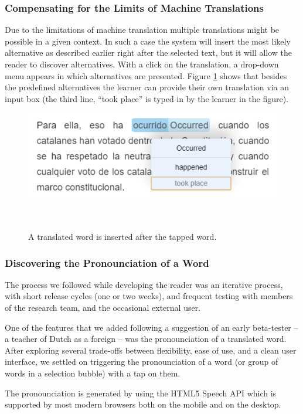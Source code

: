 \subsubsection{Compensating for the Limits of Machine Translations}
Due to the limitations of machine translation multiple translations might be possible in a given context. In such a case the system will insert the most likely alternative as described earlier right after the selected text, but it will allow the reader to discover alternatives. With a click on the translation, a drop-down menu appears in which alternatives are presented. Figure \ref{fig:registrations} shows that besides the predefined alternatives the learner can provide their own translation via an input box (the third line, ``took place'' is typed in by the learner in the figure). 


\begin{figure}[h!]
\centering
  \includegraphics[width=0.8\columnwidth]{figures/translation_alter_menu}
  \caption{A translated word is inserted after the tapped word.}~\label{fig:registrations}
\end{figure}

\subsubsection{Discovering the Pronounciation of a Word}

The process we followed while developing the reader was an iterative process, with short release cycles (one or two weeks), and frequent testing with members of the research team, and the occasional external user. 

One of the features that we added following a suggestion of an early beta-tester -- a teacher of Dutch as a foreign -- was the pronounciation of a translated word. After exploring several trade-offs between flexibility, ease of use, and a clean user interface, we settled on triggering the pronounciation of a word (or group of words in a selection bubble) with a tap on them. 

The pronounciation is generated by using the HTML5 Speech API which is supported by most modern browsers both on the mobile and on the desktop. 

